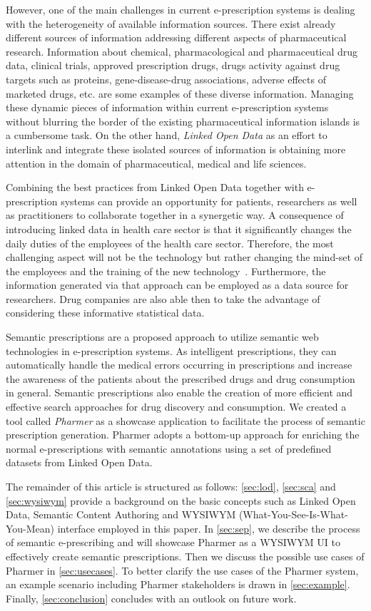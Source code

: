 \documentclass[journal]{IEEEtran}
\begin{document}
However, one of the main challenges in current e-prescription systems is dealing with the heterogeneity of available information sources.
There exist already different sources of information addressing different aspects of pharmaceutical research.
Information about chemical, pharmacological and pharmaceutical drug data, clinical trials, approved prescription drugs, drugs activity against drug targets such as proteins, gene-disease-drug associations, adverse effects of marketed drugs, etc. are some examples of these diverse information.
Managing these dynamic pieces of information within current e-prescription systems without blurring the border of the existing pharmaceutical information islands is a cumbersome task.
On the other hand, \emph{Linked Open Data} as an effort to interlink and integrate these isolated sources of information is obtaining more attention in the domain of pharmaceutical, medical and life sciences.

Combining the best practices from Linked Open Data together with e-prescription systems can provide an opportunity for patients, researchers as well as practitioners to collaborate together in a synergetic way.
A consequence of introducing linked data in health care sector is that it significantly changes the daily duties of the employees of the health care sector.
Therefore, the most challenging aspect will not be the technology but rather changing the mind-set of the employees and the training of the new technology~\cite{challengesEP}.
Furthermore, the information generated via that approach can be employed as a data source for researchers.
Drug companies are also able then to take the advantage of considering these informative statistical data.

Semantic prescriptions are a proposed approach to utilize semantic web technologies in e-prescription systems.
As intelligent prescriptions, they can automatically handle the medical errors occurring in prescriptions and increase the awareness of the patients about the prescribed drugs and drug consumption in general.
Semantic prescriptions also enable the creation of more efficient and effective search approaches for drug discovery and consumption.
We created a tool called \emph{Pharmer} as a showcase application to facilitate the process of semantic prescription generation.
Pharmer adopts a bottom-up approach for enriching the normal e-prescriptions with semantic annotations using a set of predefined datasets from Linked Open Data.

The remainder of this article is structured as follows:
\autoref{sec:lod}, \autoref{sec:sca} and \autoref{sec:wysiwym} provide a background on the basic concepts such as Linked Open Data, Semantic Content Authoring and WYSIWYM (What-You-See-Is-What-You-Mean) interface employed in this paper.
In \autoref{sec:sep}, we describe the process of semantic e-prescribing and will showcase Pharmer as a WYSIWYM UI to effectively create semantic prescriptions.
Then we discuss the possible use cases of Pharmer in \autoref{sec:usecases}.
To better clarify the use cases of the Pharmer system, an example scenario including Pharmer stakeholders is drawn in \autoref{sec:example}.
Finally, \autoref{sec:conclusion} concludes with an outlook on future work.
\end{document}
